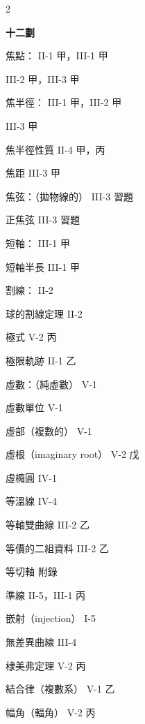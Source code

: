 \begin{multicols}{2}
\vspace{0.8em}
\begin{center}
\textbf{\large 十二劃}
\end{center}

\noindent 焦點： \hfill II-1 甲，III-1 甲\par
\noindent\hspace*{1.5em} III-2 甲，III-3 甲\par
\noindent 焦半徑： \hfill III-1 甲，III-2 甲\par
\noindent\hspace*{1.5em} III-3 甲\par
\noindent 焦半徑性質 \hfill II-4 甲，丙\par
\noindent 焦距 \hfill III-3 甲\par
\noindent 焦弦：（拋物線的） \hfill III-3 習題\par
\noindent\hspace*{1.5em} 正焦弦 \hfill III-3 習題\par
\noindent 短軸： \hfill III-1 甲\par
\noindent\hspace*{1.5em} 短軸半長 \hfill III-1 甲\par
\noindent 割線： \hfill II-2\par
\noindent\hspace*{1.5em} 球的割線定理 \hfill II-2\par
\noindent 極式 \hfill V-2 丙\par
\noindent 極限軌跡 \hfill II-1 乙\par
\noindent 虛數：（純虛數） \hfill V-1\par
\noindent\hspace*{1.5em} 虛數單位 \hfill V-1\par
\noindent\hspace*{1.5em} 虛部（複數的） \hfill V-1\par
\noindent\hspace*{1.5em} 虛根（imaginary root） \hfill V-2 戊\par
\noindent 虛橢圓 \hfill IV-1\par
\noindent 等溫線 \hfill IV-4\par
\noindent 等軸雙曲線 \hfill III-2 乙\par
\noindent 等價的二組資料 \hfill III-2 乙\par
\noindent 等切軸 \hfill 附錄\par
\noindent 準線 \hfill II-5，III-1 丙\par
\noindent 嵌射（injection） \hfill I-5\par
\noindent 無差異曲線 \hfill III-4\par
\noindent 棣美弗定理 \hfill V-2 丙\par
\noindent 結合律（複數系） \hfill V-1 乙\par
\noindent 幅角（輻角） \hfill V-2 丙\par


\end{multicols}
